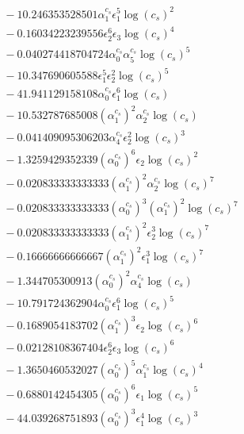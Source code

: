 \documentclass[10pt]{article}
\begin{document}
\begin{align*}
&{}  - 10.246353528501 \alpha_{1}^{c_s} \epsilon_{1}^{5} \log{\left(c_{s} \right)}^{2} \\
&{}  - 0.16034223239556 \epsilon_{2}^{6} \epsilon_{3} \log{\left(c_{s} \right)}^{4} \\
&{}  - 0.040274418704724 \alpha_{0}^{c_s} \alpha_{5}^{c_s} \log{\left(c_{s} \right)}^{5} \\
&{}  - 10.347690605588 \epsilon_{1}^{5} \epsilon_{2}^{2} \log{\left(c_{s} \right)}^{5} \\
&{}  - 41.941129158108 \alpha_{0}^{c_s} \epsilon_{1}^{6} \log{\left(c_{s} \right)} \\
&{}  - 10.532787685008 \left(\alpha_{1}^{c_s}\right)^{2} \alpha_{2}^{c_s} \log{\left(c_{s} \right)} \\
&{}  - 0.041409095306203 \alpha_{4}^{c_s} \epsilon_{2}^{2} \log{\left(c_{s} \right)}^{3} \\
&{}  - 1.3259429352339 \left(\alpha_{0}^{c_s}\right)^{6} \epsilon_{2} \log{\left(c_{s} \right)}^{2} \\
&{}  - 0.020833333333333 \left(\alpha_{1}^{c_s}\right)^{2} \alpha_{2}^{c_s} \log{\left(c_{s} \right)}^{7} \\
&{}  - 0.020833333333333 \left(\alpha_{0}^{c_s}\right)^{3} \left(\alpha_{1}^{c_s}\right)^{2} \log{\left(c_{s} \right)}^{7} \\
&{}  - 0.020833333333333 \left(\alpha_{1}^{c_s}\right)^{2} \epsilon_{2}^{3} \log{\left(c_{s} \right)}^{7} \\
&{}  - 0.16666666666667 \left(\alpha_{1}^{c_s}\right)^{2} \epsilon_{1}^{3} \log{\left(c_{s} \right)}^{7} \\
&{}  - 1.344705300913 \left(\alpha_{0}^{c_s}\right)^{2} \alpha_{4}^{c_s} \log{\left(c_{s} \right)} \\
&{}  - 10.791724362904 \alpha_{0}^{c_s} \epsilon_{1}^{6} \log{\left(c_{s} \right)}^{5} \\
&{}  - 0.1689054183702 \left(\alpha_{1}^{c_s}\right)^{3} \epsilon_{2} \log{\left(c_{s} \right)}^{6} \\
&{}  - 0.02128108367404 \epsilon_{2}^{6} \epsilon_{3} \log{\left(c_{s} \right)}^{6} \\
&{}  - 1.3650460532027 \left(\alpha_{0}^{c_s}\right)^{5} \alpha_{1}^{c_s} \log{\left(c_{s} \right)}^{4} \\
&{}  - 0.6880142454305 \left(\alpha_{0}^{c_s}\right)^{6} \epsilon_{1} \log{\left(c_{s} \right)}^{5} \\
&{}  - 44.039268751893 \left(\alpha_{0}^{c_s}\right)^{3} \epsilon_{1}^{4} \log{\left(c_{s} \right)}^{3} \\

\end{align*}
\end{document}
